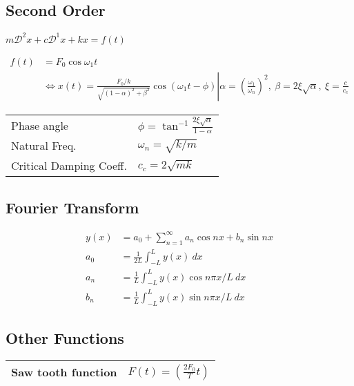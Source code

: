 \documentclass[main.tex]{subfile}
\begin{document}
\subsection{Second Order}
\label{sec:second_order}

$m\mathcal{D}^2x + c\mathcal{D}^1x + kx = f(t)$

\begin{align}
	f(t) &= F_0\cos{\omega_1 t}
	\\ & \iff \left. x(t) = \frac{F_0/k}{\sqrt{(1-\alpha)^2 + \beta^2}} \cos{(\omega_1 t -
			\phi)} \right| \alpha = (\frac{\omega_1}{\omega_n})^2,\ \beta =
	2\xi\sqrt{\alpha},\ \xi = \frac{c}{c_c}
\end{align}

\begin{table}[H]
  \begin{center}
    \begin{tabular}{ll}
      \\ \toprule
			Phase angle & $\phi = \tan^{-1}{\frac{2\xi\sqrt{\alpha}}{1-\alpha}}$
			\\Natural Freq. & $\omega_n = \sqrt{k/m}$
			\\Critical Damping Coeff. & $c_c = 2\sqrt{mk}$
      \\ \bottomrule
    \end{tabular}
  \end{center}
\end{table}




\subsection{Fourier Transform}
\label{sec:fourier_transform}

\begin{align}
	y(x)  &= a_0 + \sum_{n=1}^{\infty} a_n\cos{nx} + b_n\sin{nx}
	\\a_0 &= \frac{1}{2L} \int_{-L}^{L} y(x)\ dx
	\\a_n &= \frac{1}{L} \int_{-L}^{L} y(x) \cos{n\pi x / L}\ dx
	\\b_n &= \frac{1}{L} \int_{-L}^{L} y(x) \sin{n\pi x / L}\ dx
\end{align}


\subsection{Other Functions}
\label{sec:other_functions}

\begin{table}[H]
  \begin{center}
    \begin{tabular}{ll}
      \\ \toprule
			Saw tooth function & $F(t) = (\frac{2F_0}{T}t) $
      \\ \bottomrule
    \end{tabular}
  \end{center}
\end{table}


\end{document}
